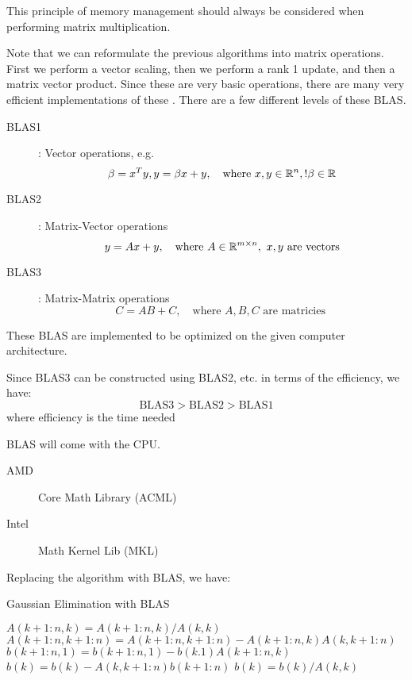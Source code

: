 \documentclass[../main/main.tex]{subfiles}
\begin{document}
\begin{remark}
This principle of memory management should always be considered when performing matrix multiplication.
\end{remark}
Note that we can reformulate the previous algorithms into matrix operations. First we perform a vector scaling, then we perform a rank 1 update, and then a matrix vector product. Since these are very basic operations, there are many very efficient implementations of these . There are a few different levels of these BLAS.
\begin{description}
  \item[BLAS1]: Vector operations, e.g. \[
        \beta = x^{T} y, y = \beta x +y,\quad \text{where }x,y \in \mathbb{R}^{n},! \beta \in \mathbb{R}
        \]
  \item[BLAS2]: Matrix-Vector operations \[
        y = Ax + y, \quad \text{where }A\in \mathbb{R}^{m \times n},~ x,y\text{ are vectors}
        \]
  \item[BLAS3]: Matrix-Matrix operations \[
        C = AB + C, \quad \text{where }A,B,C \text{ are matricies }
        \]
\end{description}
These BLAS are implemented to be optimized on the given computer architecture.
\begin{remark}
  Since BLAS3 can be constructed using BLAS2, etc. in terms of the efficiency, we have: \[
    \text{BLAS3} > \text{BLAS2} > \text{BLAS1}
  \]where efficiency is the time needed
\end{remark}
\begin{remark}
BLAS will come with the CPU.
\begin{description}
  \item[AMD] Core Math Library (ACML)
\item[Intel] Math Kernel Lib (MKL)
\end{description}
\end{remark}
Replacing the algorithm with BLAS, we have:

        	\begin{algorithm}[h!]
	\caption{Gaussian Elimination with BLAS}
	\begin{algorithmic}[1]
      \State $A(k+1:n,k)=A(k+1:n,k) / A(k,k)$
      \State $A(k+1:n,k+1:n)=A(k+1:n,k+1:n) - A(k+1:n,k)A(k,k+1:n)$
      \State $b(k+1:n,1)= b(k+1:n,1) - b(k.1)A(k+1:n,k)$
      \EndFor
      \State $b(k) = b(k) - A(k,k+1:n)b(k+1:n)$
      \State $b(k) = b(k)  / A(k,k)$
      \EndFor
	\end{algorithmic}
	\end{algorithm}
\end{document}
